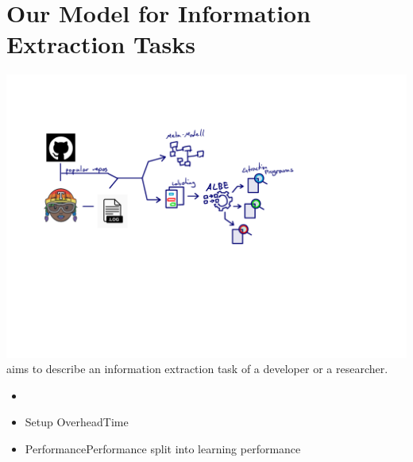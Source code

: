 \documentclass[\myrootdir/main.tex]{subfiles}
\begin{document}
\section{Our Model for Information Extraction Tasks}
\includegraphics[page=4, width=\textwidth, trim={0.5cm 0.5cm 0.5cm 0.5cm}, clip]{img/flow-of-research.pdf}
aims to describe an information extraction task of a developer or a researcher.
\begin{itemize}
  \item {}
  \item{Setup Overhead}{Time}
  \item{Performance}{Performance} split into learning performance
\end{itemize}
\end{document}
